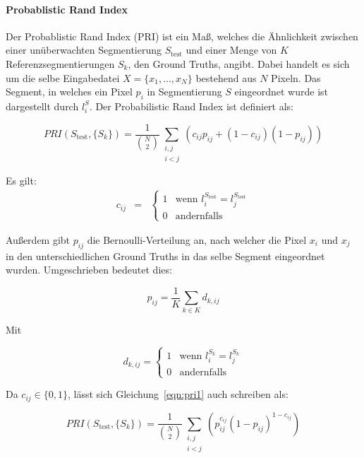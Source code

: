 \paragraph{Probablistic Rand Index}

Der Probablistic Rand Index (PRI) ist ein Maß, welches die Ähnlichkeit zwischen einer unüberwachten Segmentierung $S_\text{test}$ und einer Menge von $K$ Referenzsegmentierungen $S_k$, den Ground Truths, angibt. Dabei handelt es sich um die selbe Eingabedatei $X=\{x_1,\ldots,x_N\}$ bestehend aus $N$ Pixeln. Das Segment, in welches ein Pixel $p_i$ in Segmentierung $S$ eingeordnet wurde ist dargestellt durch $l_i^S$. Der Probabilistic Rand Index ist definiert als: \cite{pantofaru_07}

\begin{equation}
\label{eqn:pri1}
PRI(S_\text{test}, \{S_k\}) = \frac{1}{\binom{N}{2}} \sum_{\substack{i,j\\i<j}} \left(c_{ij}p_{ij}+\left(1-c_{ij}\right)\left(1-p_{ij}\right)\right)
\end{equation}

Es gilt:
\begin{eqnarray}
c_{ij}&=&\begin{cases}
1 & \text{wenn } l_i^{S_\text{test}}=l_j^{S_\text{test}}\\
0 & \text{andernfalls}
\end{cases}
\end{eqnarray}

Außerdem gibt $p_{ij}$ die Bernoulli-Verteilung an, nach welcher die Pixel $x_i$ und $x_j$ in den unterschiedlichen Ground Truths in das selbe Segment eingeordnet wurden. Umgeschrieben bedeutet dies:

\begin{equation}
p_{ij} = \frac{1}{K}\sum_{k\in K}d_{k, ij}
\end{equation}

Mit

\begin{equation}
\label{eqn:pri_d}
d_{k, ij} = \begin{cases}
1 & \text{wenn } l_i^{S_k}=l_j^{S_k}\\
0 & \text{andernfalls}
\end{cases}
\end{equation}

Da $c_{ij}\in\{0,1\}$, lässt sich Gleichung~\ref{eqn:pri1} auch schreiben als: \cite{pantofaru_07}

\begin{equation}
PRI(S_\text{test}, \{S_k\}) = \frac{1}{\binom{N}{2}} \sum_{\substack{i,j\\i<j}} \left(p_{ij}^{c_{ij}}\left(1-p_{ij}\right)^{1-c_{ij}}\right)
\end{equation}

